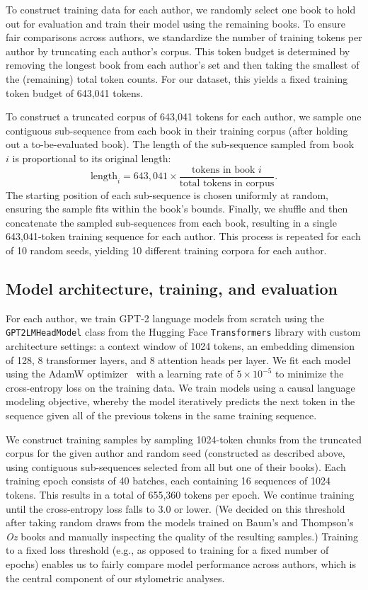 \documentclass[11pt]{article}
\begin{document}
To construct training data for each author, we randomly select one book to hold
out for evaluation and train their model using the remaining books. To ensure
fair comparisons across authors, we standardize the number of training tokens
per author by truncating each author's corpus. This token budget is determined
by removing the longest book from each author's set and then taking the
smallest of the (remaining) total token counts. For our dataset, this yields a
fixed training token budget of 643,041 tokens.

To construct a truncated corpus of 643,041 tokens for each author, we sample
one contiguous sub-sequence from each book in their training corpus (after
holding out a to-be-evaluated book). The length of the sub-sequence sampled
from book~$i$ is proportional to its original length:
\[
\text{length}_i = 643{,}041 \times \frac{\text{tokens in book
  }i}{\text{total tokens in corpus}}.
\]
The starting position of each sub-sequence is chosen uniformly at random,
ensuring the sample fits within the book's bounds. Finally, we shuffle and then
concatenate the sampled sub-sequences from each book, resulting in a single
643,041-token training sequence for each author. This process is repeated for
each of 10 random seeds, yielding 10 different training corpora for each
author.

\subsection{Model architecture, training, and evaluation}

For each author, we train GPT-2 language models from scratch using the
\texttt{GPT2LMHeadModel} class from the Hugging Face \texttt{Transformers}
library with custom architecture settings: a context window of 1024 tokens, an
embedding dimension of 128, 8 transformer layers, and 8 attention heads per
layer. We fit each model using the AdamW optimizer~\citep{LoshHutt17} with a
learning rate of $5 \times 10^{-5}$ to minimize the cross-entropy loss on the
training data. We train models using a causal language modeling objective,
whereby the model iteratively predicts the next token in the sequence given all
of the previous tokens in the same training sequence.

We construct training samples by sampling 1024-token chunks from the truncated
corpus for the given author and random seed (constructed as described above,
using contiguous sub-sequences selected from all but one of their books). Each
training epoch consists of 40 batches, each containing 16 sequences of 1024
tokens. This results in a total of 655,360 tokens per epoch. We continue
training until the cross-entropy loss falls to 3.0 or lower. (We decided on
this threshold after taking random draws from the models trained on Baum's and
Thompson's \textit{Oz} books and manually inspecting the quality of the
resulting samples.) Training to a fixed loss threshold (e.g., as opposed to
training for a fixed number of epochs) enables us to fairly compare model
performance across authors, which is the central component of our stylometric
analyses.
\end{document}
